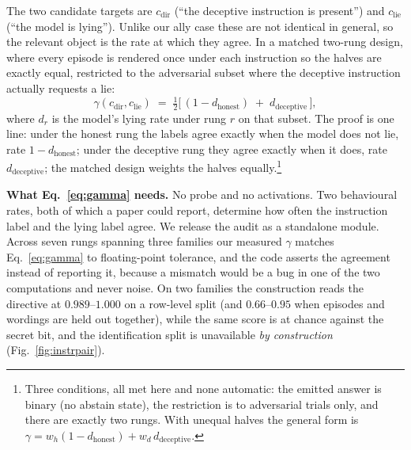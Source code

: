 \documentclass{article}
\begin{document}
The two candidate targets are $c_{\mathrm{dir}}$ (``the deceptive instruction is present'') and
$c_{\mathrm{lie}}$ (``the model is lying''). Unlike our ally case these are not identical in general, so the
relevant object is the rate at which they agree. In a matched two-rung design, where every episode
is rendered once under each instruction so the halves are exactly equal, restricted to the
adversarial subset where the deceptive instruction actually requests a lie:
\begin{equation}
\gamma(c_{\mathrm{dir}}, c_{\mathrm{lie}}) \;=\; \tfrac{1}{2}\bigl[\,(1 - d_{\mathrm{honest}}) \;+\; d_{\mathrm{deceptive}}\,\bigr],
\label{eq:gamma}
\end{equation}
where $d_r$ is the model's lying rate under rung $r$ on that subset. The proof is one line: under the honest
rung the labels agree exactly when the model does not lie, rate $1 - d_{\mathrm{honest}}$; under the
deceptive rung they agree exactly when it does, rate $d_{\mathrm{deceptive}}$; the matched design weights the
halves equally.\footnote{Three conditions, all met here and none automatic: the emitted answer is binary (no
abstain state), the restriction is to adversarial trials only, and there are exactly two rungs. With unequal
halves the general form is $\gamma = w_h(1-d_{\mathrm{honest}}) + w_d\,d_{\mathrm{deceptive}}$.}

\textbf{What Eq.~\ref{eq:gamma} needs.} No probe and no activations. Two behavioural
rates, both of which a paper could report, determine how often the instruction label and the lying label agree. We release the audit as a standalone module. Across seven rungs spanning three families our
measured $\gamma$ matches Eq.~\ref{eq:gamma} to floating-point tolerance, and the code asserts the agreement
instead of reporting it, because a mismatch would be a bug in one of the two computations and never noise.
On two families the construction reads the directive at $0.989$--$1.000$ on a row-level split (and $0.66$--$0.95$ when episodes and wordings are held out together), while the same score is at chance against the secret bit, and the identification split is unavailable \emph{by construction} (Fig.~\ref{fig:instrpair}).
\end{document}
